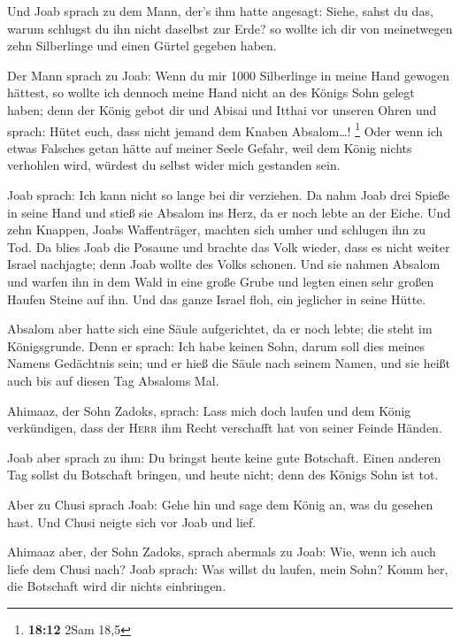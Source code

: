  Und Joab sprach zu dem Mann, der's ihm hatte angesagt:
Siehe, sahst du das, warum schlugst du ihn nicht daselbst zur Erde? so
wollte ich dir von meinetwegen zehn Silberlinge und einen Gürtel gegeben
haben.

 Der Mann sprach zu Joab: Wenn du mir 1000 Silberlinge in
meine Hand gewogen hättest, so wollte ich dennoch meine Hand nicht an
des Königs Sohn gelegt haben; denn der König gebot dir und Abisai und
Itthai vor unseren Ohren und sprach: Hütet euch, dass nicht jemand dem
Knaben Absalom\ldots! \footnote{\textbf{18:12} 2Sam 18,5}
 Oder wenn ich etwas Falsches getan hätte auf meiner
Seele Gefahr, weil dem König nichts verhohlen wird, würdest du selbst
wider mich gestanden sein.

 Joab sprach: Ich kann nicht so lange bei dir verziehen.
Da nahm Joab drei Spieße in seine Hand und stieß sie Absalom ins Herz,
da er noch lebte an der Eiche.  Und zehn Knappen, Joabs
Waffenträger, machten sich umher und schlugen ihn zu Tod.
 Da blies Joab die Posaune und brachte das Volk wieder,
dass es nicht weiter Israel nachjagte; denn Joab wollte des Volks
schonen.  Und sie nahmen Absalom und warfen ihn in dem
Wald in eine große Grube und legten einen sehr großen Haufen Steine auf
ihn. Und das ganze Israel floh, ein jeglicher in seine Hütte.

 Absalom aber hatte sich eine Säule aufgerichtet, da er
noch lebte; die steht im Königsgrunde. Denn er sprach: Ich habe keinen
Sohn, darum soll dies meines Namens Gedächtnis sein; und er hieß die
Säule nach seinem Namen, und sie heißt auch bis auf diesen Tag Absaloms
Mal.

 Ahimaaz, der Sohn Zadoks, sprach: Lass mich doch laufen
und dem König verkündigen, dass der \textsc{Herr} ihm Recht verschafft
hat von seiner Feinde Händen.

 Joab aber sprach zu ihm: Du bringst heute keine gute
Botschaft. Einen anderen Tag sollst du Botschaft bringen, und heute
nicht; denn des Königs Sohn ist tot.

 Aber zu Chusi sprach Joab: Gehe hin und sage dem König
an, was du gesehen hast. Und Chusi neigte sich vor Joab und lief.

 Ahimaaz aber, der Sohn Zadoks, sprach abermals zu Joab:
Wie, wenn ich auch liefe dem Chusi nach? Joab sprach: Was willst du
laufen, mein Sohn? Komm her, die Botschaft wird dir nichts einbringen.

